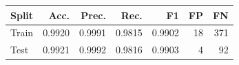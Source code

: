 \begin{tabular}{lrrrrrr}
\toprule
Split & Acc. & Prec. & Rec. & F1 & FP & FN \\
\midrule
Train & 0.9920 & 0.9991 & 0.9815 & 0.9902 & 18 & 371 \\
Test & 0.9921 & 0.9992 & 0.9816 & 0.9903 & 4 & 92 \\
\bottomrule
\end{tabular}
